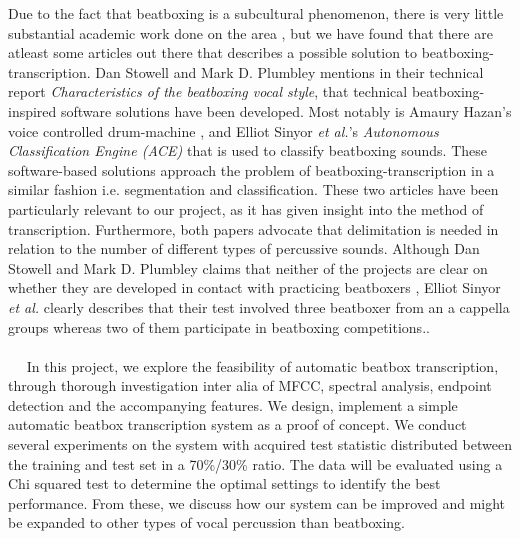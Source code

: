 Due to the fact that beatboxing is a subcultural phenomenon, there is very little substantial academic work done on the area \citep{Stowell2008}, but we have found that there are atleast some articles out there that describes a possible solution to beatboxing-transcription. Dan Stowell and Mark D. Plumbley mentions in their technical report \textit{Characteristics of the beatboxing vocal style}, that technical beatboxing-inspired software solutions have been developed. Most notably is Amaury Hazan’s voice controlled drum-machine \citep{Hazan2005}, and Elliot Sinyor \textit{et al.}’s \textit{Autonomous Classification Engine (ACE)} that is used to classify beatboxing sounds\citep{Sinyor05}. These software-based solutions approach the problem of beatboxing-transcription in a similar fashion i.e. segmentation and classification. These two articles have been particularly relevant to our project, as it has given insight into the method of transcription. Furthermore, both papers advocate that delimitation is needed in relation to the number of different types of percussive sounds. 
Although Dan Stowell and Mark D. Plumbley claims that neither of the projects are clear on whether they are developed in contact with practicing beatboxers \citep{Stowell2008},  Elliot Sinyor \textit{et al.} clearly describes that their test involved  three beatboxer from an a cappella groups whereas two of them participate in beatboxing competitions.\citep{Sinyor05}. \\
\\
 
In this project, we explore the feasibility of automatic beatbox transcription, through thorough investigation inter alia of MFCC, spectral analysis, endpoint detection and the accompanying features. We design, implement a simple automatic beatbox transcription system as a proof of concept. We conduct several experiments on the system with acquired test statistic distributed between the training and test set in a 70\%/30\% ratio. The data will be evaluated using a Chi squared test to determine the optimal settings to identify the best performance. From these, we discuss how our system can be improved and might be expanded to other types of vocal percussion than beatboxing.\\
\\
